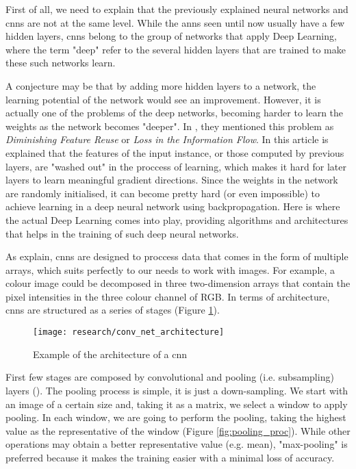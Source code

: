 First of all, we need to explain that the previously explained neural networks and \glspl{cnn} are not at the same level. While the \glspl{ann} seen until now usually have a few hidden layers, \glspl{cnn} belong to the group of networks that apply Deep Learning, where the term "deep" refer to the several hidden layers that are trained to make these such networks learn.

A conjecture may be that by adding more hidden layers to a network, the learning potential of the network would see an improvement. However, it is actually one of the problems of the deep networks, becoming harder to learn the weights as the network becomes "deeper". In \cite{huang2016deep}, they mentioned this problem as \textit{Diminishing Feature Reuse} or \textit{Loss in the Information Flow}. In this article is explained that the features of the input instance, or those computed by previous layers, are "washed out" in the proccess of learning, which makes it hard for later layers to learn meaningful gradient directions. Since the weights in the network are randomly initialised, it can become pretty hard (or even impossible) to achieve learning in a deep neural network using backpropagation. Here is where the actual Deep Learning comes into play, providing algorithms and architectures that helps in the training of such deep neural networks. 

As \cite{lecun2015deep} explain, \glspl{cnn} are designed to proccess data that comes in the form of multiple arrays, which suits perfectly to our needs to work with images. For example, a colour image could be decomposed in three two-dimension arrays that contain the pixel intensities in the three colour channel of RGB. In terms of architecture, \glspl{cnn} are structured as a series of stages (Figure \ref{fig:conv_net_architecture}). 

\begin{figure}[!ht]
	\centering
	\vspace{0.3cm}
	\texttt{[image: research/conv\_net\_architecture]}
	\caption{Example of the architecture of a \gls{cnn} \cite{haykin2009neural}}
	\label{fig:conv_net_architecture}
\end{figure}

First few stages are composed by convolutional and pooling (i.e. subsampling) layers (\cite{lecun2015deep}). The pooling process is simple, it is just a down-sampling. We start with an image of a certain size and, taking it as a matrix, we select a window to apply pooling. In each window, we are going to perform the pooling, taking the highest value as the representative of the window (Figure \ref{fig:pooling_proc}). While other operations may obtain a better representative value (e.g. mean), "max-pooling" is preferred because it makes the training easier with a minimal loss of accuracy.

